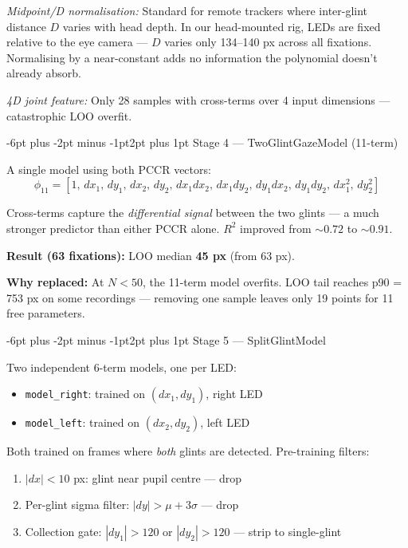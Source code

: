 \documentclass[10pt,twocolumn]{article}
\makeatletter
\renewcommand\subsection{\@startsection{subsection}{2}{\z@}%
  {-6pt plus -2pt minus -1pt}{2pt plus 1pt}%
  {\normalfont\bfseries}}
\makeatother
\begin{document}
\textit{Midpoint/D normalisation:} Standard for remote trackers where inter-glint distance $D$ varies with head depth. In our head-mounted rig, LEDs are fixed relative to the eye camera — $D$ varies only 134--140 px across all fixations. Normalising by a near-constant adds no information the polynomial doesn't already absorb.

\textit{4D joint feature:} Only 28 samples with cross-terms over 4 input dimensions — catastrophic LOO overfit.

\subsection{Stage 4 — TwoGlintGazeModel (11-term)}

A single model using both PCCR vectors:
\[
\phi_{11} = [1,\,dx_1,\,dy_1,\,dx_2,\,dy_2,\,dx_1 dx_2,\,dx_1 dy_2,\,dy_1 dx_2,\,dy_1 dy_2,\,dx_1^2,\,dy_2^2]
\]

Cross-terms capture the \textit{differential signal} between the two glints — a much stronger predictor than either PCCR alone. $R^2$ improved from ${\sim}0.72$ to ${\sim}0.91$.

\textbf{Result (63 fixations):} LOO median \textbf{45 px} (from 63 px).

\textbf{Why replaced:} At $N < 50$, the 11-term model overfits. LOO tail reaches p90 = 753 px on some recordings — removing one sample leaves only 19 points for 11 free parameters.

\subsection{Stage 5 — SplitGlintModel}

Two independent 6-term models, one per LED:
\begin{itemize}
  \item \texttt{model\_right}: trained on $(dx_1, dy_1)$, right LED
  \item \texttt{model\_left}: trained on $(dx_2, dy_2)$, left LED
\end{itemize}

Both trained on frames where \textit{both} glints are detected. Pre-training filters:
\begin{enumerate}
  \item $|dx| < 10$ px: glint near pupil centre — drop
  \item Per-glint sigma filter: $|dy| > \mu + 3\sigma$ — drop
  \item Collection gate: $|dy_1| > 120$ or $|dy_2| > 120$ — strip to single-glint
\end{enumerate}
\end{document}
